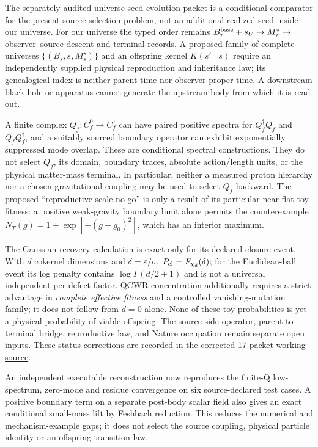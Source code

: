 \documentclass[11pt]{article}
\begin{document}
The separately audited universe-seed evolution packet is a conditional
comparator for the present source-selection problem, not an additional
realized seed inside our universe.  For our universe the typed order remains
$B_\tau^{\rm base}+s_U\to M_\tau^\star\to$ observer--source descent and
terminal records.  A proposed family of complete universes
$\{(B_s,s,M_s^\star)\}$ and an offspring kernel $K(s'\mid s)$ require an
independently supplied physical reproduction and inheritance law; its
genealogical index is neither parent time nor observer proper time.  A
downstream black hole or apparatus cannot generate the upstream body from
which it is read out.

A finite complex $Q_f:C_f^0\to C_f^1$ can have paired positive spectra for
$Q_f^\dagger Q_f$ and $Q_fQ_f^\dagger$, and a suitably sourced boundary
operator can exhibit exponentially suppressed mode overlap.  These are
conditional spectral constructions.  They do not select $Q_f$, its domain,
boundary traces, absolute action/length units, or the physical matter-mass
terminal.  In particular, neither a measured proton hierarchy nor a chosen
gravitational coupling may be used to select $Q_f$ backward.  The proposed
``reproductive scale no-go'' is only a result of its particular near-flat
toy fitness: a positive weak-gravity boundary limit alone permits the
counterexample $N_T(g)=1+\exp[-(g-g_0)^2]$, which has an interior maximum.

The Gaussian recovery calculation is exact only for its declared closure
event.  With $d$ cokernel dimensions and $\delta=\varepsilon/\sigma$,
$P_{\rm cl}=F_{\chi_d}(\delta)$; for the Euclidean-ball event its log penalty
contains $\log\Gamma(d/2+1)$ and is not a universal independent-per-defect
factor.  QCWR concentration additionally requires a strict advantage in
\emph{complete effective fitness} and a controlled vanishing-mutation
family; it does not follow from $d=0$ alone.  None of these toy probabilities
is yet a physical probability of viable offspring.  The source-side
operator, parent-to-terminal bridge, reproductive law, and Nature occupation
remain separate open inputs.  These status corrections are recorded in the
\href{https://github.com/jolcsak/tau-core/tree/43e475215f8fc5bf35610b0f450e582f7de148f3/theory/universe_seed_evolution}{corrected
17-packet working source}.

An independent executable reconstruction now reproduces the finite-Q
low-spectrum, zero-mode and residue convergence on six source-declared test
cases. A positive boundary term on a separate post-body scalar field also
gives an exact conditional small-mass lift by Feshbach reduction. This
reduces the numerical and mechanism-example gaps; it does not select the
source coupling, physical particle identity or an offspring transition law.
\end{document}
